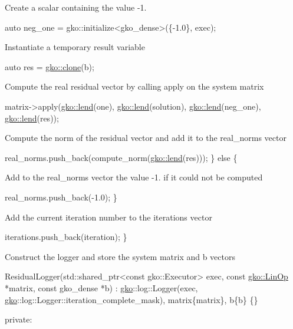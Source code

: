 Create a scalar containing the value -\/1.


\begin{DoxyCode}
\textcolor{keyword}{auto} neg\_one = gko::initialize<gko\_dense>(\{-1.0\}, exec);
\end{DoxyCode}


Instantiate a temporary result variable


\begin{DoxyCode}
\textcolor{keyword}{auto} res = \hyperlink{namespacegko_a1beb80750459e4201aa9d882d2d074c3}{gko::clone}(b);
\end{DoxyCode}


Compute the real residual vector by calling apply on the system matrix


\begin{DoxyCode}
matrix->apply(\hyperlink{namespacegko_aa8cb4876b72e5e1036ea9575443c439b}{gko::lend}(one), \hyperlink{namespacegko_aa8cb4876b72e5e1036ea9575443c439b}{gko::lend}(solution),
              \hyperlink{namespacegko_aa8cb4876b72e5e1036ea9575443c439b}{gko::lend}(neg\_one), \hyperlink{namespacegko_aa8cb4876b72e5e1036ea9575443c439b}{gko::lend}(res));
\end{DoxyCode}


Compute the norm of the residual vector and add it to the {\ttfamily real\+\_\+norms} vector


\begin{DoxyCode}
    real\_norms.push\_back(compute\_norm(\hyperlink{namespacegko_aa8cb4876b72e5e1036ea9575443c439b}{gko::lend}(res)));
\} \textcolor{keywordflow}{else} \{
\end{DoxyCode}


Add to the {\ttfamily real\+\_\+norms} vector the value -\/1. if it could not be computed


\begin{DoxyCode}
    real\_norms.push\_back(-1.0);
\}
\end{DoxyCode}


Add the current iteration number to the {\ttfamily iterations} vector


\begin{DoxyCode}
    iterations.push\_back(iteration);
\}
\end{DoxyCode}


Construct the logger and store the system matrix and b vectors


\begin{DoxyCode}
    ResidualLogger(std::shared\_ptr<const gko::Executor> exec,
                   \textcolor{keyword}{const} \hyperlink{classgko_1_1LinOp}{gko::LinOp} *matrix, \textcolor{keyword}{const} gko\_dense *b)
        : \hyperlink{namespacegko}{gko}::log::Logger(exec, \hyperlink{namespacegko}{gko}::log::Logger::iteration\_complete\_mask),
          matrix\{matrix\},
          b\{b\}
    \{\}

\textcolor{keyword}{private}:
\end{DoxyCode}


